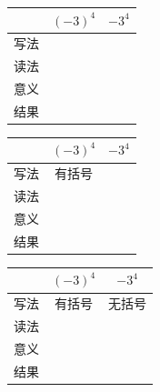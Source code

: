\documentclass{beamer}
\begin{document}
\newlength\laa\newlength\lbb
\settowidth{}\settowidth{}
\def\tia{\makebox[\laa]{\ }}\def\tib{\makebox[\lbb]{\ }}
\begin{frame}\begin{table}[htbp]\centering\begin{tabular}{l|c|c}
      \toprule      \ & $(-3)^4$ & $-3^4$ \\
      \hline\hline  写法 & \tia & \tib \\
      \hline        读法 & \tia & \tib \\
      \hline        \multirow{2}{*}{意义} &\tia &\tib \\
                    &\tia & \tib\\
      \hline       结果 & \tia &  \\
\bottomrule\end{tabular}\end{table}\end{frame}
\begin{frame}\begin{table}[htbp]\centering\begin{tabular}{l|c|c}
      \toprule      \ & $(-3)^4$ & $-3^4$ \\
      \hline\hline  写法 & 有括号 & \tib \\
      \hline        读法 &\tia  & \\
      \hline        \multirow{2}{*}{意义} &  &  \\
                    & & \\
      \hline       结果 & &  \\
\bottomrule\end{tabular}\end{table}\end{frame}
\begin{frame}\begin{table}[htbp]\centering\begin{tabular}{l|c|c}
      \toprule      \ & $(-3)^4$ & $-3^4$ \\
      \hline\hline  写法 & 有括号 & 无括号 \\
      \hline        读法 & \tia & \tib \\
      \hline        \multirow{2}{*}{意义} & &  \\
                    & &\\
      \hline       结果 & &  \\
\bottomrule\end{tabular}\end{table}\end{frame}
\end{document}
